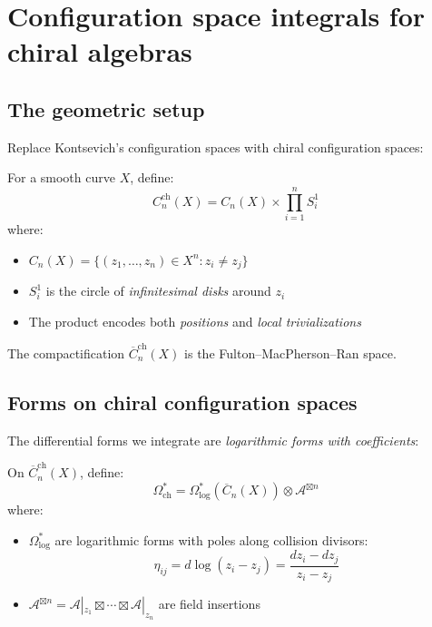 \section{Configuration space integrals for chiral algebras}

\subsection{The geometric setup}

Replace Kontsevich's configuration spaces with chiral configuration spaces:

\begin{definition}
For a smooth curve $X$, define:
\[C_n^{\text{ch}}(X) = C_n(X) \times \prod_{i=1}^n S^1_i\]
where:
\begin{itemize}
\item $C_n(X) = \{(z_1, \ldots, z_n) \in X^n : z_i \neq z_j\}$
\item $S^1_i$ is the circle of \emph{infinitesimal disks} around $z_i$
\item The product encodes both \emph{positions} and \emph{local trivializations}
\end{itemize}

The compactification $\overline{C}_n^{\text{ch}}(X)$ is the Fulton--MacPherson--Ran space.
\end{definition}

\subsection{Forms on chiral configuration spaces}

The differential forms we integrate are \emph{logarithmic forms with coefficients}:

\begin{definition}
On $\overline{C}_n^{\text{ch}}(X)$, define:
\[\Omega^*_{\text{ch}} = \Omega^*_{\text{log}}(\overline{C}_n(X)) \otimes \mathcal{A}^{\boxtimes n}\]
where:
\begin{itemize}
\item $\Omega^*_{\text{log}}$ are logarithmic forms with poles along collision divisors:
\[\eta_{ij} = d\log(z_i - z_j) = \frac{dz_i - dz_j}{z_i - z_j}\]
\item $\mathcal{A}^{\boxtimes n} = \mathcal{A}|_{z_1} \boxtimes \cdots \boxtimes \mathcal{A}|_{z_n}$ are field insertions
\end{itemize}
\end{definition}

